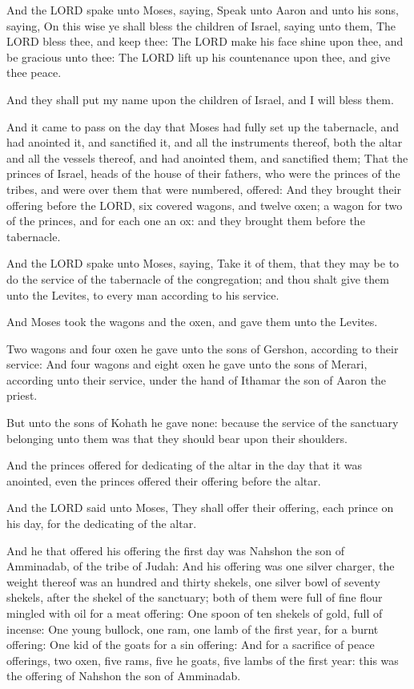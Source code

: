 \Verse And the LORD spake unto Moses, saying, \Verse Speak unto Aaron and
unto his sons, saying, On this wise ye shall bless the children of
Israel, saying unto them, \Verse The LORD bless thee, and keep thee:
\Verse The LORD make his face shine upon thee, and be gracious unto
thee: \Verse The LORD lift up his countenance upon thee, and give thee
peace.

\Verse And they shall put my name upon the children of Israel, and I
will bless them.


\Chapter
\Verse And it came to pass on the day that Moses had fully set up the
tabernacle, and had anointed it, and sanctified it, and all the
instruments thereof, both the altar and all the vessels thereof, and
had anointed them, and sanctified them; \Verse That the princes of
Israel, heads of the house of their fathers, who were the princes of
the tribes, and were over them that were numbered, offered: \Verse And
they brought their offering before the LORD, six covered wagons, and
twelve oxen; a wagon for two of the princes, and for each one an ox:
and they brought them before the tabernacle.

\Verse And the LORD spake unto Moses, saying, \Verse Take it of them, that
they may be to do the service of the tabernacle of the congregation;
and thou shalt give them unto the Levites, to every man according to
his service.

\Verse And Moses took the wagons and the oxen, and gave them unto the
Levites.

\Verse Two wagons and four oxen he gave unto the sons of Gershon,
according to their service: \Verse And four wagons and eight oxen he gave
unto the sons of Merari, according unto their service, under the hand
of Ithamar the son of Aaron the priest.

\Verse But unto the sons of Kohath he gave none: because the service of
the sanctuary belonging unto them was that they should bear upon their
shoulders.

\Verse And the princes offered for dedicating of the altar in the day
that it was anointed, even the princes offered their offering before
the altar.

\Verse And the LORD said unto Moses, They shall offer their offering,
each prince on his day, for the dedicating of the altar.

\Verse And he that offered his offering the first day was Nahshon the
son of Amminadab, of the tribe of Judah: \Verse And his offering was one
silver charger, the weight thereof was an hundred and thirty shekels,
one silver bowl of seventy shekels, after the shekel of the sanctuary;
both of them were full of fine flour mingled with oil for a meat
offering: \Verse One spoon of ten shekels of gold, full of incense: \Verse
One young bullock, one ram, one lamb of the first year, for a burnt
offering: \Verse One kid of the goats for a sin offering: \Verse And for a
sacrifice of peace offerings, two oxen, five rams, five he goats, five
lambs of the first year: this was the offering of Nahshon the son of
Amminadab.

